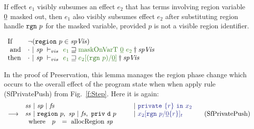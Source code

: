 %
\begin{lemma} If effect $e_1$ visibly subsumes an effect $e_2$ that has terms involving region variable $\underline{0}$ masked out, then $e_1$ also visibly subsumes effect $e_2$ after substituting region handle $\texttt{rgn}~ p$ for the masked variable, provided $p$ is not a visible region identifier.
\label{l:subsVisibleT_mask}
\end{lemma}
$
\begin{array}{ll}
    \pIf        & \neg(\sregion{p} \in \mspVis)
\\ ~\pand       & \SubsVisibleT
                        {\nil}{\msp}{\mspVis}{e_1}
                        {\mmaskOnVarT~ \un{0}~ e_2}
\\  \pthen      & \SubsVisibleT
                        {\nil}{\msp}{\mspVis}{e_1}
                        {\subsTT{\un{0}}
                                {(\trgn{p})}
                                {e_2}
                        }
\end{array}
$

\medskip\noindent
In the proof of Preservation, this lemma manages the region phase change which occurs to the overall effect of the program state when when apply rule (SfPrivatePush) from Fig.~\ref{f:Step}. Here it is again:
$$
\begin{array}{lllr}
        & \mss ~|~ \msp ~|~ \mfs 
        & \hspace{-1em} ~|~ \cx{\kprivate~ \bra{r}~ \kin~ x_2}              \\
\lto    & \mss ~|~ \sregion{p},~ \msp ~|~ \mfs,~ \fprivd{p} ~~~~~~~
        & \hspace{-1em} ~|~ \cx{x_2[\trgn{p}/\un{0}\bra{r}]_t}
\\
        & \mcarray{2}{l}{lll}
          { \trm{where} 
                & p  & = ~\trm{allocRegion}~ \msp
          }
\end{array}
~~~~ \trm{(SfPrivatePush)}
$$

